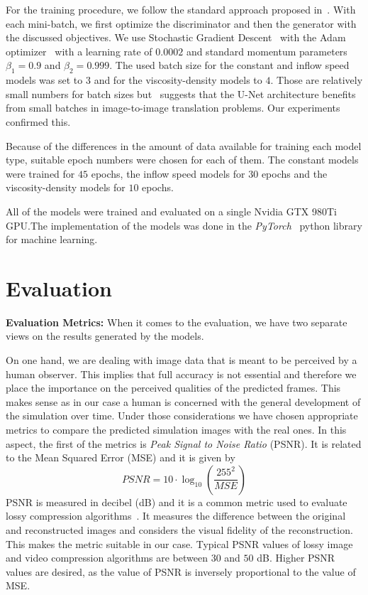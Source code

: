 \documentclass{llncs}
\begin{document}
For the training procedure, we follow the standard approach proposed in~\cite{goodfellow2014}. With each mini-batch, we first optimize the discriminator and then the generator with the discussed objectives. We use Stochastic Gradient Descent~\cite{kiefer1952} with the Adam optimizer~\cite{kingma2014} with a learning rate of $0.0002$ and standard momentum parameters $\beta_1=0.9$ and $\beta_2=0.999$. The used batch size for the constant and inflow speed models was set to $3$ and for the viscosity-density models to $4$. Those are relatively small numbers for batch sizes but~\cite{pix2pix} suggests that the U-Net architecture benefits from small batches in image-to-image translation problems. Our experiments confirmed this.

Because of the differences in the amount  of data available for training each model type, suitable epoch numbers were chosen for each of them. The constant models were trained for $45$ epochs, the inflow speed models for $30$ epochs and the viscosity-density models for $10$ epochs.

All of the models were trained and evaluated on a single Nvidia GTX 980Ti GPU.\@ The implementation of the models was done in the \emph{PyTorch}~\cite{paszke2017automatic} python library for machine learning.

\section{Evaluation}\label{eval}
\noindent\textbf{Evaluation Metrics:} When it comes to the evaluation, we have two separate views on the results generated by the models.

On one hand, we are dealing with image data that is meant to be perceived by a human observer. This implies that full accuracy is not essential and therefore we place the importance on the perceived qualities of the predicted frames. This makes sense as in our case a human is concerned with the general development of the simulation over time. Under those considerations we have chosen appropriate metrics to compare the predicted simulation images with the real ones. In this aspect, the first of the metrics is \emph{Peak Signal to Noise Ratio} (PSNR). It is related to the Mean Squared Error (MSE) and it is given by
\begin{equation}
PSNR = 10 \cdot \log_{10}\left(\frac{255^2}{MSE}\right)
\end{equation}
PSNR is measured in decibel (dB) and it is a common metric used to evaluate lossy compression algorithms~\cite{psnr1,psnr2}. It measures the difference between the original and reconstructed images and considers the visual fidelity of the reconstruction. This makes the metric suitable in our case. Typical PSNR values of lossy image and video compression algorithms are between $30$ and $50$ dB. Higher PSNR values are desired, as the value of PSNR is inversely proportional to the value of MSE.
\end{document}
